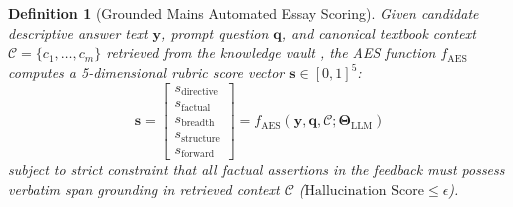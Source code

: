 \documentclass[conference]{IEEEtran}
\newtheorem{definition}{Definition}
\begin{document}
\begin{definition}[Grounded Mains Automated Essay Scoring]
Given candidate descriptive answer text $\mathbf{y}$, prompt question $\mathbf{q}$, and canonical textbook context $\mathcal{C} = \{c_1, \dots, c_m\}$ retrieved from the knowledge vault \cite{Lewis2020}, the AES function $f_{\text{AES}}$ computes a 5-dimensional rubric score vector $\mathbf{s} \in [0, 1]^5$:
\begin{equation}
    \mathbf{s} = \begin{bmatrix} s_{\text{directive}} \\ s_{\text{factual}} \\ s_{\text{breadth}} \\ s_{\text{structure}} \\ s_{\text{forward}} \end{bmatrix} = f_{\text{AES}}(\mathbf{y}, \mathbf{q}, \mathcal{C}; \boldsymbol{\Theta}_{\text{LLM}})
    \label{eq:aes_vector}
\end{equation}
subject to strict constraint that all factual assertions in the feedback must possess verbatim span grounding in retrieved context $\mathcal{C}$ ($\text{Hallucination Score} \le \epsilon$).
\end{definition}
\end{document}

